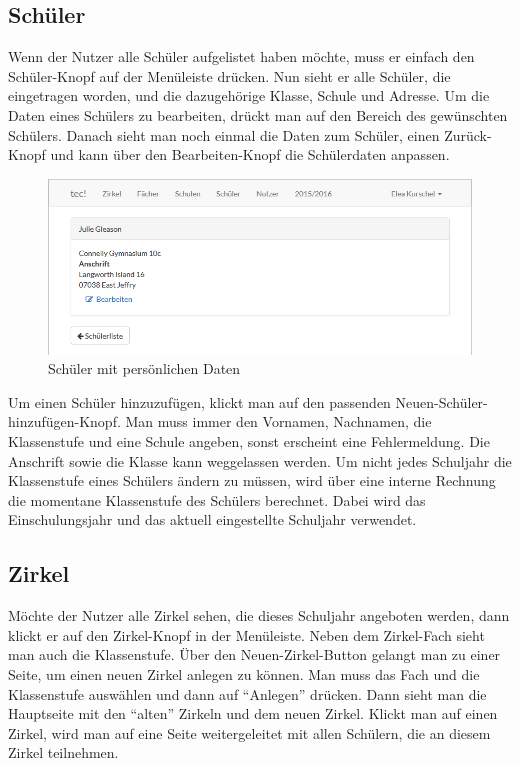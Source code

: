 \subsection{Schüler}
Wenn der Nutzer alle Schüler aufgelistet haben möchte, muss er einfach den Schüler-Knopf auf der Menüleiste drücken. Nun sieht er alle Schüler, die eingetragen worden, und die dazugehörige Klasse, Schule und Adresse. Um die Daten eines Schülers zu bearbeiten, drückt man auf den Bereich des gewünschten Schülers. Danach sieht man noch einmal die Daten zum Schüler, einen Zurück-Knopf und kann über den Bearbeiten-Knopf die Schülerdaten anpassen.

\begin{figure}[ht]
	\centering
	\includegraphics[scale=.5]{bilder/Schueler_Daten.png}
	\caption{Schüler mit persönlichen Daten}
\end{figure}

Um einen Schüler hinzuzufügen, klickt man auf den passenden Neuen-Schüler-hinzufügen-Knopf. Man muss immer den Vornamen, Nachnamen, die Klassenstufe und eine Schule angeben, sonst erscheint eine Fehlermeldung. Die Anschrift sowie die Klasse kann weggelassen werden. Um nicht jedes Schuljahr die Klassenstufe eines Schülers ändern zu müssen, wird über eine interne Rechnung die momentane Klassenstufe des Schülers berechnet. Dabei wird das Einschulungsjahr und das aktuell eingestellte Schuljahr verwendet.

\newpage \subsection{Zirkel}
Möchte der Nutzer alle Zirkel sehen, die dieses Schuljahr angeboten werden, dann klickt er auf den Zirkel-Knopf in der Menüleiste. Neben dem Zirkel-Fach sieht man auch die Klassenstufe. Über den Neuen-Zirkel-Button gelangt man zu einer Seite, um einen neuen Zirkel anlegen zu können. Man muss das Fach und die Klassenstufe auswählen und dann auf "`Anlegen"' drücken. Dann sieht man die Hauptseite mit den "`alten"' Zirkeln und dem neuen Zirkel. Klickt man auf einen Zirkel, wird man auf eine Seite weitergeleitet mit allen Schülern, die an diesem Zirkel teilnehmen. 

